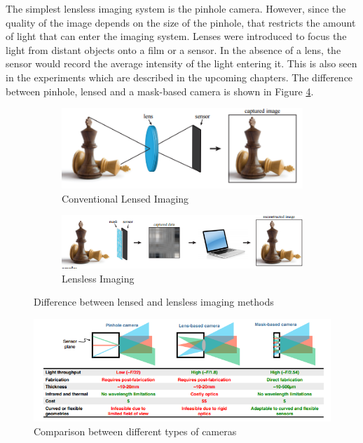 The simplest lensless imaging system is the pinhole camera. However, since the quality of the image depends on the size of the pinhole, that restricts the amount of light that can enter the imaging system. Lenses were introduced to focus the light from distant objects onto a film or a sensor. In the absence of a lens, the sensor would record the average intensity of the light entering it. This is also seen in the experiments which are described in the upcoming chapters. The difference between pinhole, lensed and a mask-based camera is shown in Figure \ref{fig:flatcam_comp}.
\begin{figure}[ht]
\centering
\begin{subfigure}{\textwidth}
  \centering
  \includegraphics[width=0.75\linewidth]{pics/lensless_1}
  \caption{Conventional Lensed Imaging}
  \label{fig:lensed_imaging}
\end{subfigure}
\begin{subfigure}{\textwidth}
  \centering
  \includegraphics[width=0.75\linewidth]{pics/lensless_2}
  \caption{Lensless Imaging}
  \label{fig:lensless_imaging}
\end{subfigure}
\caption{Difference between lensed and lensless imaging methods\cite{VBoomi}}
\label{fig:lensvslensless}
\end{figure}

\begin{figure}[ht]
\includegraphics[width=\textwidth]{pics/flatcam_comp}
\caption{Comparison between different types of cameras\cite{Flatcam}}
\label{fig:flatcam_comp}
\end{figure}

